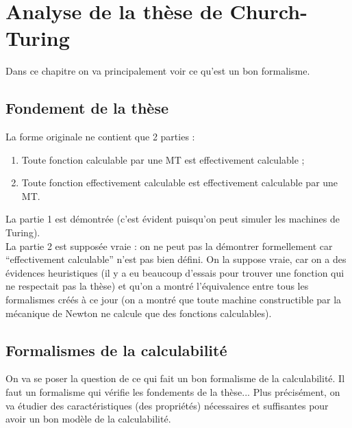 
\chapter{Analyse de la thèse de Church-Turing}
\label{sec:analyse_de_la_th_se_de_church_turing}
Dans ce chapitre on va principalement voir ce qu'est un bon formalisme.

\section{Fondement de la thèse}
\label{sub:fondement_de_la_th_se}
\begin{mythese}
La forme originale ne contient que 2 parties :
\begin{enumerate}
	\item Toute fonction calculable par une MT est effectivement calculable ;
	\item Toute fonction effectivement calculable est effectivement calculable par une MT.
\end{enumerate}
\end{mythese}

La partie 1 est démontrée (c'est évident puisqu'on peut simuler les machines de Turing).\\

La partie 2 est supposée vraie : on ne peut pas la démontrer formellement car ``effectivement calculable'' n'est pas bien défini. On la suppose vraie, car on a des évidences heuristiques (il y a eu beaucoup d'essais pour trouver une fonction qui ne respectait pas la thèse) et qu'on a montré l'équivalence entre tous les formalismes créés à ce jour (on a montré que toute machine constructible par la mécanique de Newton ne calcule que des fonctions calculables).

\section{Formalismes de la calculabilité}
\label{sub:formalismes_de_la_calculabilit_}
On va se poser la question de ce qui fait un bon formalisme de la calculabilité. Il faut un formalisme qui vérifie les fondements de la thèse... Plus précisément, on va étudier des caractéristiques (des propriétés) nécessaires et suffisantes pour avoir un bon modèle de la calculabilité.

